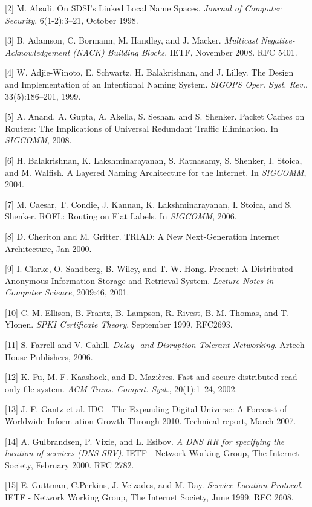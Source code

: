 [2] M. Abadi. On SDSI’s Linked Local Name Spaces. \emph{Journal of Computer Security}, 6(1-2):3–21, October 1998.

[3] B. Adamson, C. Bormann, M. Handley, and J. Macker.
\emph{Multicast Negative-Acknowledgement (NACK) Building
Blocks}. IETF, November 2008. RFC 5401.

[4] W. Adjie-Winoto, E. Schwartz, H. Balakrishnan, and
J. Lilley. The Design and Implementation of an Intentional Naming System. \emph{SIGOPS Oper. Syst. Rev.}, 33(5):186–201, 1999.

[5] A. Anand, A. Gupta, A. Akella, S. Seshan, and S. Shenker. Packet Caches on Routers: The Implications of Universal Redundant Traffic Elimination. In \emph{SIGCOMM}, 2008.

[6] H. Balakrishnan, K. Lakshminarayanan, S. Ratnasamy, S. Shenker, I. Stoica, and M. Walfish. A Layered Naming Architecture for the Internet. In \emph{SIGCOMM}, 2004.

[7] M. Caesar, T. Condie, J. Kannan, K. Lakshminarayanan,
I. Stoica, and S. Shenker. ROFL: Routing on Flat Labels. In \emph{SIGCOMM}, 2006.

[8] D. Cheriton and M. Gritter. TRIAD: A New Next-Generation Internet Architecture, Jan 2000.

[9] I. Clarke, O. Sandberg, B. Wiley, and T. W. Hong. Freenet: A Distributed Anonymous Information Storage and Retrieval System. \emph{Lecture Notes in Computer Science}, 2009:46, 2001.

[10] C. M. Ellison, B. Frantz, B. Lampson, R. Rivest, B. M. Thomas, and T. Ylonen. \emph{SPKI Certificate Theory}, September 1999. RFC2693.

[11] S. Farrell and V. Cahill. \emph{Delay- and Disruption-Tolerant Networking}. Artech House Publishers, 2006.

[12] K. Fu, M. F. Kaashoek, and D. Mazières. Fast and secure distributed read-only file system. \emph{ACM Trans. Comput. Syst.}, 20(1):1–24, 2002.

[13] J. F. Gantz et al. IDC - The Expanding Digital Universe: A Forecast of Worldwide Inform ation Growth Through 2010. Technical report, March 2007.

[14] A. Gulbrandsen, P. Vixie, and L. Esibov. \emph{A DNS RR for specifying the location of services (DNS SRV)}. IETF - Network Working Group, The Internet Society, February 2000. RFC 2782.

[15] E. Guttman, C.Perkins, J. Veizades, and M. Day. \emph{Service Location Protocol}. IETF - Network Working Group, The Internet Society, June 1999. RFC 2608.

